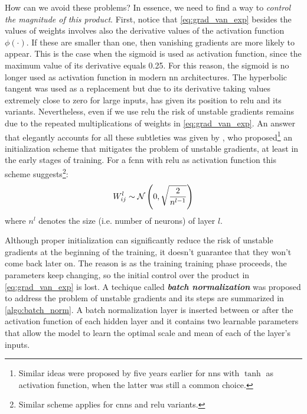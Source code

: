 How can we avoid these problems? In essence, we need to find a way to
\emph{control the magnitude of this product}. First, notice that \Equation{}
\ref{eq:grad_van_exp} besides the values of weights involves also the derivative
values of the activation function $\phi(\cdot)$. If these are smaller than one, then
vanishing gradients are more likely to appear. This is the case when the
sigmoid is used as activation function, since the maximum value
of its derivative equals \num{0.25}. For this reason, the sigmoid is no longer
used as activation function in modern \gls{nn} architectures. The hyperbolic
tangent was used as a replacement but due to its
derivative taking values extremely close to zero for large inputs, has given its
position to \gls{relu} and its variants. Nevertheless, even if we use \gls{relu}
the risk of unstable gradients remains due to the repeated multiplications of
weights in \Equation{} \ref{eq:grad_van_exp}. An answer that
elegantly accounts for all these subtleties was given by \cite{He2015}, who
proposed\footnote{Similar ideas were proposed by \cite{Glorot2010} five years
earlier for \glspl{nn} with $\tanh$ as activation function, when the latter was
still a common choice.} an initialization scheme that mitigates the problem of
unstable gradients, at least in the early stages of
training. For a \gls{fcnn} with \gls{relu} as activation function this scheme
suggests\footnote{Similar scheme applies for \glspl{cnn} and \gls{relu}
variants.}:
\begin{equation}
	\label{eq:he_initialization}
	W_{ij}^l \sim \mathcal{N}\left(0, \sqrt{\frac{2}{n^{l-1}}}\right)
\end{equation}
where $n^{l}$ denotes the size (i.e. number of neurons) of layer $l$.

Although proper initialization can significantly reduce the risk of unstable
gradients at the beginning of the training, it doesn't guarantee that they won't
come back later on. The reason is as the training training phase proceeds,
the parameters keep changing, so the initial control over the product in
\Equation{} \ref{eq:grad_van_exp} is lost. A techique called \emph{\textbf{batch
normalization}} \parencite{Ioffe2015} was proposed to
address the problem of unstable gradients and its steps are summarized in
\Algorithm{} \ref{algo:batch_norm}. A batch normalization layer is inserted between or after the activation function of
each hidden layer and it contains two learnable parameters that allow the model
to learn the optimal scale and mean of each of the layer's inputs.

